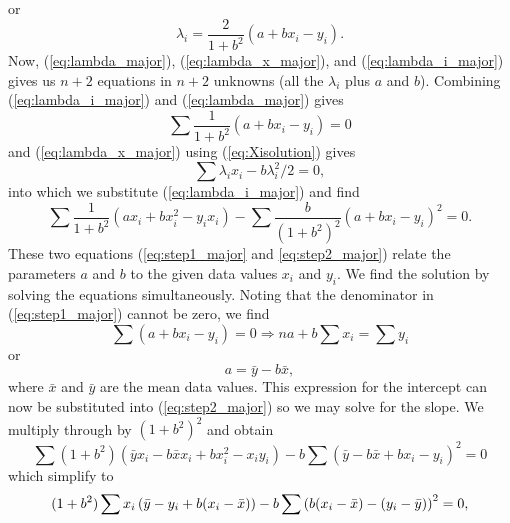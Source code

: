 or
\begin{equation}
\lambda_i = \frac{2}{1 + b^2}\left (a + bx_i - y_i\right ).
\label{eq:lambda_i_major}
\end{equation}
Now, (\ref{eq:lambda_major}), (\ref{eq:lambda_x_major}), and (\ref{eq:lambda_i_major}) gives us
$n+2$ equations in $n+2$ unknowns (all the $\lambda_i$ plus $a$ and $b$).  Combining 
(\ref{eq:lambda_i_major}) and (\ref{eq:lambda_major}) gives
\begin{equation}
\sum	  \frac{1}{1+b^2} \left ( a + b x_i - y_i\right ) =  0
\label{eq:step1_major}
\end{equation}	
and (\ref{eq:lambda_x_major}) using (\ref{eq:Xisolution}) gives
\begin{equation}
\sum \lambda_i x_i - b\lambda ^2_i/2 = 0,
\end{equation}	 
into which we substitute (\ref{eq:lambda_i_major}) and find
\begin{equation}
\sum \frac{1}{1 + b^2}\left (ax_i + bx^2_i - y_i x_i\right ) - \sum \frac{b}{(1+b^2)^2}\left (a+bx_i - y_i\right ) ^2 = 0.
\label{eq:step2_major} 
\end{equation}
These two equations (\ref{eq:step1_major} and \ref{eq:step2_major}) relate the parameters $a$ and $b$ to the given data values $x_i$ and $y_i$.  We find 
the solution by solving the equations simultaneously.  Noting that the denominator in (\ref{eq:step1_major}) cannot be zero, we find
\begin{equation}
\sum (a+ b x_i - y_i) = 0 \Rightarrow na + b \sum x_i = \sum y_i
\end{equation}	 
or
\begin{equation}
a = \bar{y} - b \bar{x},
\end{equation}
where $\bar{x}$  and $\bar{y}$ are the mean data values.  This expression for the intercept can now be substituted into 
(\ref{eq:step2_major}) so we may solve for the slope.  We multiply through by $(1 + b^2)^2$ and obtain
\begin{equation}
\sum (1 + b^2) \left ( \bar{y}x_i - b \bar{x} x_i + b x^2_i - x_i y_i \right ) -b \sum  \left ( \bar{y} - b \bar{x} + b x_i - y_i\right ) ^2 = 0
\end{equation}
which simplify to
\begin{equation}
\displaystyle (1 + b^2) \sum x_i \left ( \bar{y} - y_i + b (x_i - \bar{x}) \right ) -b \sum \left ( b ( x_i - \bar{x}) - (y_i - \bar{y})\right ) ^2 = 0,\\*[2ex]
\end{equation}
